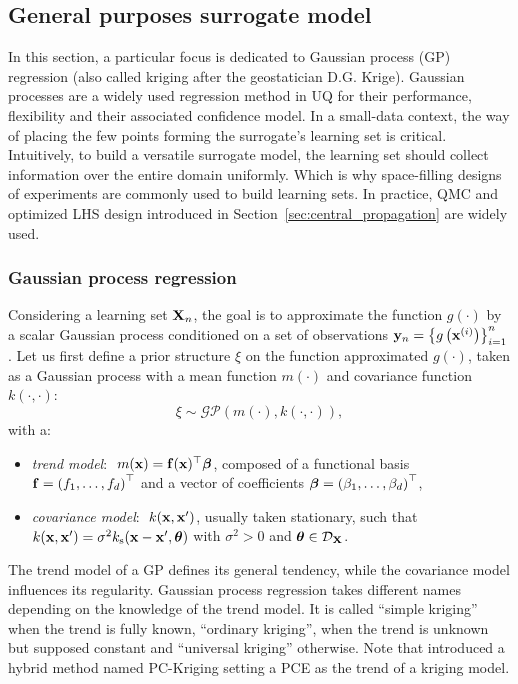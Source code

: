 \subsection{General purposes surrogate model}

In this section, a particular focus is dedicated to Gaussian process (GP) regression (also called kriging after the geostatician D.G. Krige). 
Gaussian processes are a widely used regression method in UQ for their performance, flexibility and their associated confidence model. 
In a small-data context, the way of placing the few points forming the surrogate's learning set is critical. 
Intuitively, to build a versatile surrogate model, the learning set should collect information over the entire domain uniformly. 
Which is why space-filling designs of experiments are commonly used to build learning sets. 
In practice, QMC and optimized LHS design introduced in Section~\ref{sec:central_propagation} are widely used.  

\subsubsection{Gaussian process regression}

Considering a learning set ${\bf X}_n$, the goal is to approximate the function $g(\cdot)$ by a scalar Gaussian process conditioned on a set of observations ${\bf y}_n = \left\{g\left({\bf x}^{(i)}\right)\right\}_{i=1}^n$. 
Let us first define a prior structure $\xi$ on the function approximated $g(\cdot)$, taken as a Gaussian process with a mean function $m(\cdot)$ and covariance function $k(\cdot, \cdot)$:  
\begin{equation}
    \xi \sim \mathcal{GP}(m(\cdot), k(\cdot, \cdot)),
\end{equation} 
with a: 
\begin{itemize}
    \item \textit{trend model}: $~m({\bf x}) = \mathbf{f}({\bf x})^\top {\boldsymbol{\beta}}$, composed of a functional basis $\mathbf{f} = \left(f_1, \dots, f_d\right)^\top$ and a vector of coefficients 
    ${\boldsymbol{\beta}} = \left(\beta_1, \dots, \beta_d\right)^\top$,
    \item \textit{covariance model}: $~k({\bf x}, {\bf x}')$, usually taken stationary, such that $k({\bf x}, {\bf x}') = \sigma^2 k_{\mathrm{s}}({\bf x} - {\bf x}', {\boldsymbol{\theta}})$ with $\sigma^2>0$ and ${\boldsymbol{\theta}} \in \mathcal{D}_{\bf X}$.
\end{itemize}
The trend model of a GP defines its general tendency, while the covariance model influences its regularity. 
Gaussian process regression takes different names depending on the knowledge of the trend model. 
It is called ``simple kriging'' when the trend is fully known, ``ordinary kriging'', when the trend is unknown but supposed constant and ``universal kriging'' otherwise. 
Note that \cite{schobi_2015} introduced a hybrid method named PC-Kriging setting a PCE as the trend of a kriging model. %

